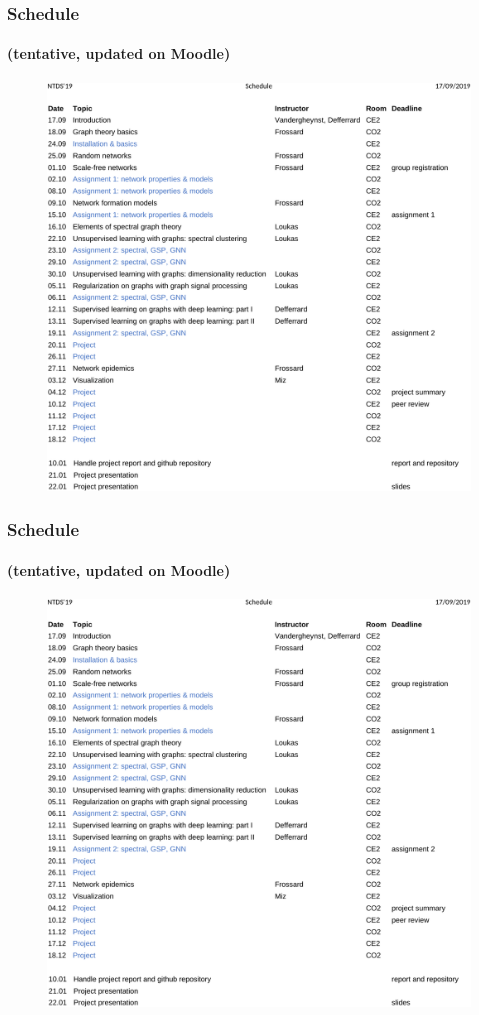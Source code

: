 \documentclass[aspectratio=169]{beamer}
\begin{document}

\begin{frame}
	\frametitle{Schedule}
	\framesubtitle{(tentative, updated on Moodle)}
	\begin{figure}
		\includegraphics[width=\linewidth,trim={0 8.2cm 0 0.8cm},clip]{ntds2019_schedule_v4}
	\end{figure}
\end{frame}


\begin{frame}
	\frametitle{Schedule}
	\framesubtitle{(tentative, updated on Moodle)}
	\begin{figure}
		\includegraphics[width=\linewidth,trim={0 0 0 8.6cm},clip]{ntds2019_schedule_v4}
	\end{figure}
\end{frame}
\end{document}
